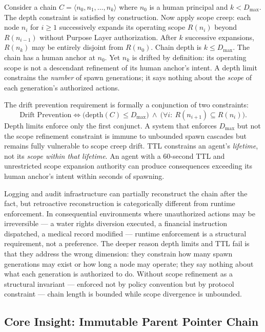 Consider a chain $C = \langle n_0, n_1, \ldots, n_k \rangle$ where $n_0$ is a human principal and $k < D_{\max}$. The depth constraint is satisfied by construction. Now apply scope creep: each node $n_i$ for $i \geq 1$ successively expands its operating scope $R(n_i)$ beyond $R(n_{i-1})$ without Purpose Layer authorization. After $k$ successive expansions, $R(n_k)$ may be entirely disjoint from $R(n_0)$. Chain depth is $k \leq D_{\max}$. The chain has a human anchor at $n_0$. Yet $n_k$ is drifted by definition: its operating scope is not a descendant refinement of its human anchor's intent. A depth limit constrains the \emph{number} of spawn generations; it says nothing about the \emph{scope} of each generation's authorized actions.

The drift prevention requirement is formally a conjunction of two constraints:
\begin{equation}
\text{Drift Prevention} \iff \bigl(\text{depth}(C) \leq D_{\max}\bigr)\ \land\ \bigl(\forall i:\ R(n_{i+1}) \subseteq R(n_i)\bigr).
\label{eq:intro-drift-prevention}
\end{equation}
Depth limits enforce only the first conjunct. A system that enforces $D_{\max}$ but not the scope refinement constraint is immune to unbounded spawn cascades but remains fully vulnerable to scope creep drift. TTL constrains an agent's \emph{lifetime}, not its \emph{scope within that lifetime}. An agent with a 60-second TTL and unrestricted scope expansion authority can produce consequences exceeding its human anchor's intent within seconds of spawning.

Logging and audit infrastructure can partially reconstruct the chain after the fact, but retroactive reconstruction is categorically different from runtime enforcement. In consequential environments where unauthorized actions may be irreversible — a water rights diversion executed, a financial instruction dispatched, a medical record modified — runtime enforcement is a structural requirement, not a preference. The deeper reason depth limits and TTL fail is that they address the wrong dimension: they constrain how many spawn generations may exist or how long a node may operate; they say nothing about what each generation is authorized to do. Without scope refinement as a structural invariant — enforced not by policy convention but by protocol constraint — chain length is bounded while scope divergence is unbounded.

\subsection{Core Insight: Immutable Parent Pointer Chain}

